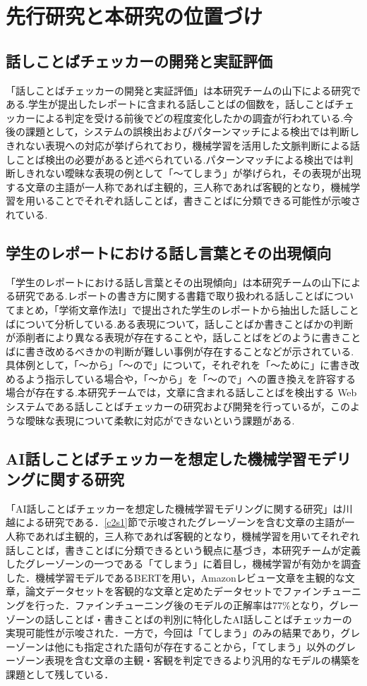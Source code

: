 \chapter{先行研究と本研究の位置づけ\label{c2}}

\section{話しことばチェッカーの開発と実証評価 \label{c2s1}}
「話しことばチェッカーの開発と実証評価」は本研究チームの山下による研究である.学生が提出したレポートに含まれる話しことばの個数を，話しことばチェッカーによる判定を受ける前後でどの程度変化したかの調査が行われている.今後の課題として，システムの誤検出およびパターンマッチによる検出では判断しきれない表現への対応が挙げられており，機械学習を活用した文脈判断による話しことば検出の必要があると述べられている.パターンマッチによる検出では判断しきれない曖昧な表現の例として「～てしまう」が挙げられ，その表現が出現する文章の主語が一人称であれば主観的，三人称であれば客観的となり，機械学習を用いることでそれぞれ話しことば，書きことばに分類できる可能性が示唆されている.

\section{学生のレポートにおける話し言葉とその出現傾向 \label{c2s2}}
「学生のレポートにおける話し言葉とその出現傾向」は本研究チームの山下による研究である.レポートの書き方に関する書籍で取り扱われる話しことばについてまとめ，「学術文章作法I」で提出された学生のレポートから抽出した話しことばについて分析している.ある表現について，話しことばか書きことばかの判断が添削者により異なる表現が存在することや，話しことばをどのように書きことばに書き改めるべきかの判断が難しい事例が存在することなどが示されている.具体例として，「～から」「～ので」について，それぞれを「～ために」に書き改めるよう指示している場合や，「～から」を「～ので」への置き換えを許容する場合が存在する.本研究チームでは，文章に含まれる話しことばを検出する Web システムである話しことばチェッカーの研究および開発を行っているが，このような曖昧な表現について柔軟に対応ができないという課題がある.

\section{AI話しことばチェッカーを想定した機械学習モデリングに関する研究 \label{c2s3}}
「AI話しことばチェッカーを想定した機械学習モデリングに関する研究」\cite{ai-checker}は川越による研究である．\ref{c2s1}節で示唆されたグレーゾーンを含む文章の主語が一人称であれば主観的，三人称であれば客観的となり，機械学習を用いてそれぞれ話しことば，書きことばに分類できるという観点に基づき，本研究チームが定義したグレーゾーンの一つである「てしまう」に着目し，機械学習が有効かを調査した．機械学習モデルであるBERTを用い，Amazonレビュー文章を主観的な文章，論文データセットを客観的な文章と定めたデータセットでファインチューニングを行った．ファインチューニング後のモデルの正解率は77\%となり，グレーゾーンの話しことば・書きことばの判別に特化したAI話しことばチェッカーの実現可能性が示唆された．一方で，今回は「てしまう」のみの結果であり，グレーゾーンは他にも指定された語句が存在することから，「てしまう」以外のグレーゾーン表現を含む文章の主観・客観を判定できるより汎用的なモデルの構築を課題として残している．

